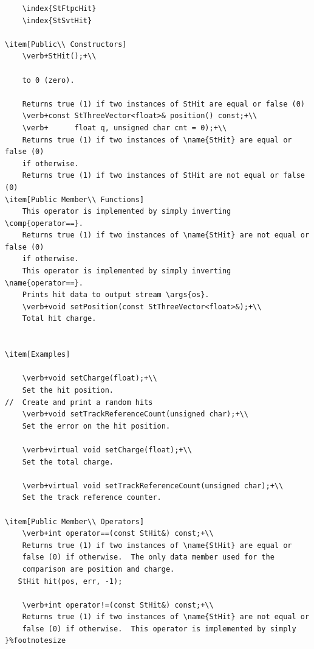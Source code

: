 \begin{Entry}
{\begin{verbatim}
    \index{StFtpcHit}
    \index{StSvtHit}
    
\item[Public\\ Constructors]
    \verb+StHit();+\\
    
    to 0 (zero).

    Returns true (1) if two instances of StHit are equal or false (0)
    \verb+const StThreeVector<float>& position() const;+\\
    \verb+      float q, unsigned char cnt = 0);+\\
    Returns true (1) if two instances of \name{StHit} are equal or false (0)
    if otherwise.
    Returns true (1) if two instances of StHit are not equal or false (0)
\item[Public Member\\ Functions]
    This operator is implemented by simply inverting \comp{operator==}.
    Returns true (1) if two instances of \name{StHit} are not equal or false (0)
    if otherwise. 
    This operator is implemented by simply inverting \name{operator==}.
    Prints hit data to output stream \args{os}.
    \verb+void setPosition(const StThreeVector<float>&);+\\
    Total hit charge.

    
\item[Examples] 

    \verb+void setCharge(float);+\\
    Set the hit position.
//  Create and print a random hits 
    \verb+void setTrackReferenceCount(unsigned char);+\\
    Set the error on the hit position.

    \verb+virtual void setCharge(float);+\\
    Set the total charge.

    \verb+virtual void setTrackReferenceCount(unsigned char);+\\
    Set the track reference counter.
    
\item[Public Member\\ Operators]
    \verb+int operator==(const StHit&) const;+\\
    Returns true (1) if two instances of \name{StHit} are equal or
    false (0) if otherwise.  The only data member used for the
    comparison are position and charge.
   StHit hit(pos, err, -1); 

    \verb+int operator!=(const StHit&) const;+\\
    Returns true (1) if two instances of \name{StHit} are not equal or
    false (0) if otherwise.  This operator is implemented by simply
}%footnotesize    


\end{verbatim}}
\end{Entry}
